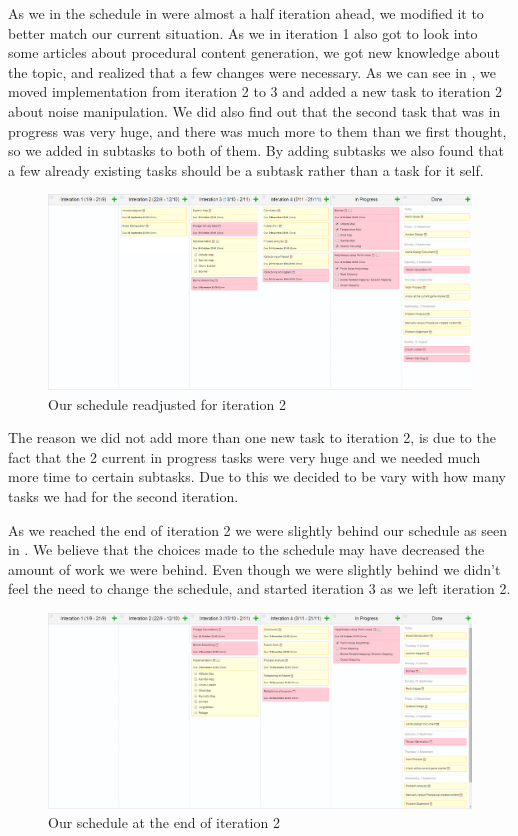 As we in the schedule in  were almost a half iteration ahead, we modified it to better match our current situation. As we in iteration 1 also got to look into some articles about procedural content generation, we got new knowledge about the topic, and realized that a few changes were necessary. As we can see in , we moved implementation from iteration 2 to 3 and added a new task to iteration 2 about noise manipulation. We did also find out that the second task that was in progress was very huge, and there was much more to them than we first thought, so we added in subtasks to both of them. By adding subtasks we also found that a few already existing tasks should be a subtask rather than a task for it self.

\begin{figure}[H]
	\includegraphics[width=1.0\linewidth]{img/BeforeIteration2}
	\centering
	\caption{Our schedule readjusted for iteration 2}
	\label{fig:BeforeIteration2}
\end{figure}

The reason we did not add more than one new task to iteration 2, is due to the fact that the 2 current in progress tasks were very huge and we needed much more time to certain subtasks. Due to this we decided to be vary with how many tasks we had for the second iteration.

As we reached the end of iteration 2 we were slightly behind our schedule as seen in . We believe that the choices made to the schedule may have decreased the amount of work we were behind. Even though we were slightly behind we didn't feel the need to change the schedule, and started iteration 3 as we left iteration 2.

\begin{figure}[H]
	\includegraphics[width=1.0\linewidth]{img/BeforeIteration3}
	\centering
	\caption{Our schedule at the end of iteration 2}
	\label{fig:BeforeIteration3}
\end{figure}

